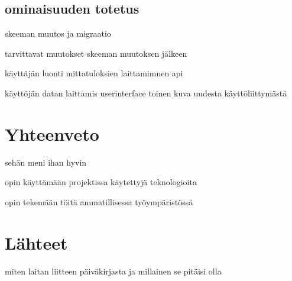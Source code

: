 \documentclass[11pt,a4paper,titlepage,oneside]{article}
\begin{document}
\subsection{ominaisuuden totetus}

skeeman muutos ja migraatio


tarvittavat muutokset skeeman muutoksen jälkeen


käyttäjän luonti
mittatuloksien laittamimnen api


käyttöjän datan laittamis userinterface
toinen kuva uudesta käyttöliittymästä








\newpage
\section{Yhteenveto}

sehän meni ihan hyvin 

opin käyttämään projektissa käytettyjä teknologioita

opin tekemään töitä ammatillisessa työympäristössä




\newpage
\section{Lähteet}               %

miten laitan liitteen päiväkirjasta ja millainen se pitäisi olla
\end{document}
